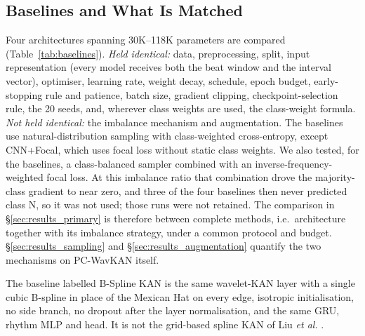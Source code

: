 \documentclass[preprint,12pt]{elsarticle}
\begin{document}
\subsection{Baselines and What Is Matched}
\label{sec:baselines}
Four architectures spanning 30K--118K parameters are compared (Table~\ref{tab:baselines}). \emph{Held identical:} data, preprocessing, split, input representation (every model receives both the beat window and the interval vector), optimiser, learning rate, weight decay, schedule, epoch budget, early-stopping rule and patience, batch size, gradient clipping, checkpoint-selection rule, the 20 seeds, and, wherever class weights are used, the class-weight formula. \emph{Not held identical:} the imbalance mechanism and augmentation. The baselines use natural-distribution sampling with class-weighted cross-entropy, except CNN+Focal, which uses focal loss without static class weights. We also tested, for the baselines, a class-balanced sampler combined with an inverse-frequency-weighted focal loss. At this imbalance ratio that combination drove the majority-class gradient to near zero, and three of the four baselines then never predicted class N, so it was not used; those runs were not retained. The comparison in \S\ref{sec:results_primary} is therefore between complete methods, i.e.\ architecture together with its imbalance strategy, under a common protocol and budget. \S\ref{sec:results_sampling} and \S\ref{sec:results_augmentation} quantify the two mechanisms on PC-WavKAN itself.

The baseline labelled B-Spline KAN is the same wavelet-KAN layer with a single cubic B-spline in place of the Mexican Hat on every edge, isotropic initialisation, no side branch, no dropout after the layer normalisation, and the same GRU, rhythm MLP and head. It is not the grid-based spline KAN of Liu \emph{et al.} \cite{liu_kan_2024}.

\begin{table}[!htbp]
\caption{Baselines. Protocol, split, inputs, optimiser, budget, checkpoint rule and seeds are identical to PC-WavKAN (\S\ref{sec:baselines}).}
\label{tab:baselines}
\centering
\footnotesize
{}
\end{table}
\end{document}
